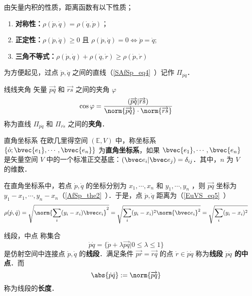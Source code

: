 由矢量内积的性质，距离函数有以下性质；
\begin{enumerate}
\item \textbf{对称性：}$\rho(\dot p,\dot q)=\rho(\dot q,\dot p)$；
\item \textbf{正定性：}$\rho(\dot p,\dot q)\geq 0$ 且 $\rho(\dot p,\dot q)= 0\Leftrightarrow\dot p=\dot q$;
\item \textbf{三角不等式：}$\rho(\dot p,\dot q)+\rho(\dot q,\dot r)\geq\rho(\dot p,\dot r)$
\end{enumerate}
为方便起见，过点 $\dot p,\dot q$ 之间的直线（\autoref{SAfSp_eq4}~）记作 $\Pi_{\dot p\dot q}$．
\begin{definition}{线线夹角}
矢量 $\overrightarrow{pq}$ 和 $\overrightarrow{rs}$ 之间的夹角 $\varphi$
\begin{equation}
\cos\varphi=\frac{(\overrightarrow{pq}|\overrightarrow{rs})}{\norm{\overrightarrow{pq}}\cdot\norm{\overrightarrow{rs}}}
\end{equation}
称为直线 $\Pi_{\dot p\dot q}$ 和 $\Pi_{\dot r\dot s}$ 之间的\textbf{夹角}．
\end{definition}
\begin{definition}{直角坐标系}
在欧几里得空间 $(\mathbb E,V)$ 中，称坐标系 $\{\dot o;\bvec{e_1},\cdots,\bvec{e_n}\}$ 为\textbf{直角坐标系}，如果 $\bvec{e_1},\cdots,\bvec{e_n}$ 是矢量空间 $V$ 中的一个标准正交基底：$(\bvec e_i|\bvec e_j)=\delta_{ij}$．其中，$n$ 为 $V$ 的维数．
\end{definition}
\begin{example}{}
在直角坐标系中，若点 $\dot p,\dot q$ 的坐标分别为 $x_1,\cdots,x_n$ 和 $y_1,\cdots,y_n$ ，则 $\overrightarrow{pq}$ 坐标为 $y_1-x_1,\cdots,y_n-x_n$（\autoref{AfSp_the2}~）．于是，点 $\dot p,\dot q$ 距离为（\autoref{EuVS_eq5}~）
\begin{equation}
\rho(\dot p,\dot q)=\sqrt{\norm{\sum_{i}(y_i-x_i)\bvec e_i}^2}=\sqrt{\sum_{i}(y_i-x_i)^2\norm{\bvec e_i}^2}=\sqrt{\sum_{i}(y_i-x_i)^2}
\end{equation}
\end{example}
\begin{definition}{线段，中点}
称集合
\begin{equation}
\dot p\dot q=\{\dot p+\lambda\overrightarrow{pq}|0\leq\lambda\leq1\}
\end{equation}
是仿射空间中连接点 $\dot p,\dot q$ 的\textbf{线段}．满足条件 $\overrightarrow{pr}=\overrightarrow{rq}$ 的点 $\dot r\in\dot p\dot q$ 称为\textbf{线段 $\dot p\dot q$ 的中点}．而
\begin{equation}
\abs{\dot p\dot q}:=\norm{\overrightarrow{pq}}
\end{equation}
称为线段的\textbf{长度}．
\end{definition}
